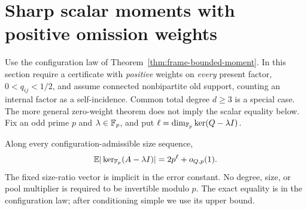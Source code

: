 \section{Sharp scalar moments with positive omission weights}
\label{sec:frame-scalar}
Use the configuration law of Theorem~\ref{thm:frame-bounded-moment}.
In this section require a certificate with \emph{positive} weights on
\emph{every} present factor, $0<q_{ij}<1/2$, and assume connected
nonbipartite old support, counting an internal factor as a self-incidence.
Common total degree $d\ge3$ is a special case. The more general
zero-weight theorem does not imply the scalar equality below.
Fix an odd prime $p$ and
$\lambda\in\mathbb F_p$, and put $\ell=\dim_{\mathbb F_p}\ker(Q-\lambda I)$.

\begin{theorem}\label{thm:frame-scalar}
Along every configuration-admissible size sequence,
\[
 \mathbb E|\ker_{\mathbb F_p}(A-\lambda I)|=2p^\ell+o_{Q,p}(1).
\]
The fixed size-ratio vector is implicit in the error constant.
No degree, size, or pool multiplier is required to be invertible modulo
$p$. The exact equality is in the configuration law; after conditioning
simple we use its upper bound.
\end{theorem}
